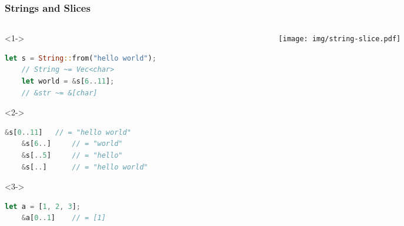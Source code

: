 \begin{frame}[fragile]
    \frametitle{Strings and Slices}

    \begin{columns}
    \begin{column}{0.5\textwidth}

    \begin{overlayarea}{\linewidth}{7cm}
    \begin{onlyenv}<1->
    \begin{lstlisting}[language=rust]
    let s = String::from("hello world");
    // String ~= Vec<char>
    let world = &s[6..11];
    // &str ~= &[char]
    \end{lstlisting}
    \end{onlyenv}

    \begin{onlyenv}<2->
    \begin{lstlisting}[language=rust]
    &s[0..11]   // = "hello world"
    &s[6..]     // = "world"
    &s[..5]     // = "hello"
    &s[..]      // = "hello world"
    \end{lstlisting}
    \end{onlyenv}

    \begin{onlyenv}<3->
    \begin{lstlisting}[language=rust]
    let a = [1, 2, 3];
    &a[0..1]    // = [1]
    \end{lstlisting}
    \end{onlyenv}

    \end{overlayarea}
    \end{column}

    \begin{column}{0.5\textwidth}
        \begin{figure}
            \texttt{[image: img/string-slice.pdf]}
        \end{figure}
    \end{column}
    \end{columns}
\end{frame}


